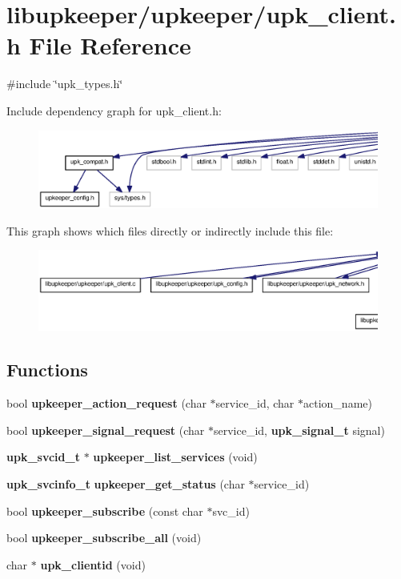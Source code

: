 \section{libupkeeper/upkeeper/upk\_\-client.h File Reference}
\label{upk__client_8h}
{\ttfamily \#include \char`\"{}upk\_\-types.h\char`\"{}}\par
Include dependency graph for upk\_\-client.h:\nopagebreak
\begin{figure}[H]
\begin{center}
\leavevmode
\includegraphics[width=400pt]{upk__client_8h__incl}
\end{center}
\end{figure}
This graph shows which files directly or indirectly include this file:
\nopagebreak
\begin{figure}[H]
\begin{center}
\leavevmode
\includegraphics[width=400pt]{upk__client_8h__dep__incl}
\end{center}
\end{figure}
\subsection*{Functions}
\begin{DoxyCompactItemize}
\item 
bool {\bf upkeeper\_\-action\_\-request} (char $\ast$service\_\-id, char $\ast$action\_\-name)
\item 
bool {\bf upkeeper\_\-signal\_\-request} (char $\ast$service\_\-id, {\bf upk\_\-signal\_\-t} signal)
\item 
{\bf upk\_\-svcid\_\-t} $\ast$ {\bf upkeeper\_\-list\_\-services} (void)
\item 
{\bf upk\_\-svcinfo\_\-t} {\bf upkeeper\_\-get\_\-status} (char $\ast$service\_\-id)
\item 
bool {\bf upkeeper\_\-subscribe} (const char $\ast$svc\_\-id)
\item 
bool {\bf upkeeper\_\-subscribe\_\-all} (void)
\item 
char $\ast$ {\bf upk\_\-clientid} (void)
\end{DoxyCompactItemize}


